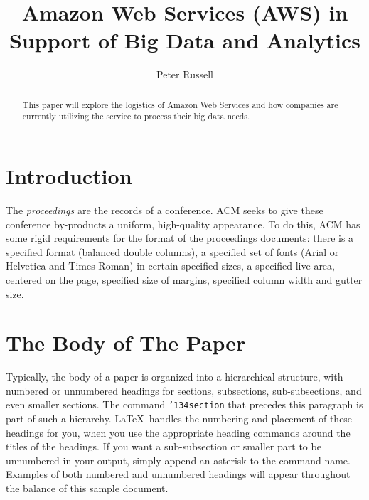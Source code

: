\documentclass[sigconf]{acmart}
\begin{document}
\title{Amazon Web Services (AWS) in Support of Big Data and Analytics}


\author{Peter Russell}

\begin{abstract}
This paper will explore the logistics of Amazon Web Services and how companies are currently utilizing the service to process their big data needs. 
\end{abstract}



\maketitle

\section{Introduction}

The \textit{proceedings} are the records of a
conference. ACM seeks to give these
conference by-products a uniform, high-quality appearance.  To do
this, ACM has some rigid requirements for the format of the
proceedings documents: there is a specified format (balanced double
columns), a specified set of fonts (Arial or Helvetica and Times
Roman) in certain specified sizes, a specified live area, centered on
the page, specified size of margins, specified column width and gutter
size.

\section{The Body of The Paper}

Typically, the body of a paper is organized into a hierarchical
structure, with numbered or unnumbered headings for sections,
subsections, sub-subsections, and even smaller sections.  The command
\texttt{{\char'134}section} that precedes this paragraph is part of
such a hierarchy. \LaTeX\ handles the
numbering and placement of these headings for you, when you use the
appropriate heading commands around the titles of the headings.  If
you want a sub-subsection or smaller part to be unnumbered in your
output, simply append an asterisk to the command name.  Examples of
both numbered and unnumbered headings will appear throughout the
balance of this sample document.
\end{document}
